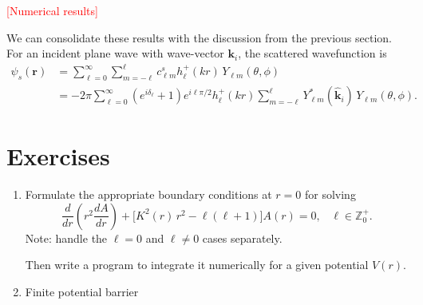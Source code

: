 \documentclass[pra,12pt]{revtex4}
\begin{document}
\textcolor{red}{[Numerical results]}

We can consolidate these results with the discussion from the previous
section.  For an incident plane wave with wave-vector $\mathbf{k}_i$,
the scattered wavefunction is
$$\begin{aligned}\psi_s(\mathbf{r}) &= \sum_{\ell=0}^\infty \sum_{m=-\ell}^\ell c_{\ell m}^s h_\ell^+(kr) \, Y_{\ell m}(\theta,\phi) \\ &= - 2\pi \sum_{\ell=0}^\infty (e^{i\delta_\ell} + 1) e^{i\ell\pi/2} h_\ell^+(kr) \sum_{m=-\ell}^\ell Y_{\ell m}^*(\hat{\mathbf{k}}_i) \, Y_{\ell m}(\theta,\phi). \end{aligned}$$


\section*{Exercises}

\begin{enumerate}
\item \label{ex:numerical_spherical}
  Formulate the appropriate boundary conditions at $r = 0$ for solving
$$\frac{d}{dr}\left(r^2\frac{dA}{dr}\right) + \Big[K^2(r)\, r^2 - \ell(\ell+1)\Big] A(r) = 0, \;\;\;\ell \in \mathbb{Z}_0^+.$$
  Note: handle the $\ell = 0$ and $\ell \ne 0$ cases separately.

  Then write a program to integrate it numerically for a given
  potential $V(r)$.

\item \label{ex:spherical_barrier}
  Finite potential barrier
\end{enumerate}
\end{document}
